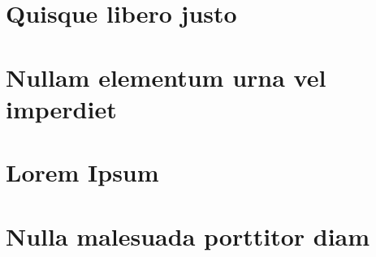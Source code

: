 



\begin{apendicesenv}
\partapendices
%
\chapter{Quisque libero justo}
\lipsum[50]

\chapter{Nullam elementum urna vel imperdiet}
\lipsum[55-57]
\end{apendicesenv}

\begin{anexosenv}
\partanexos

\chapter{Lorem Ipsum}
\lipsum[1-4]

\chapter{Nulla malesuada porttitor diam}
\lipsum[3-6] 

\end{anexosenv}


\printindex